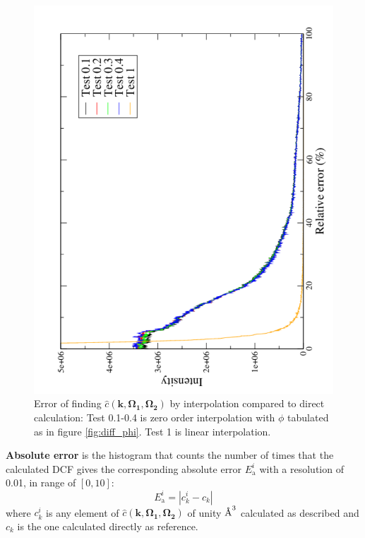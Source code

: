 \begin{figure}[h]
\begin{minipage}[t]{1.1\textwidth}
\begin{center}
\par\end{center}

\begin{center}
\includegraphics[angle=-90,scale=0.3]{_figure/c_local_to_global_coordinates_32_96/relative_error}
\par\end{center}

\caption[Error of finding $\hat{c}(\mathbf{k},\mathbf{\Omega_{1}},\mathbf{\Omega_{2}})$
by interpolation compared to direct calculation]{Error of finding $\hat{c}(\mathbf{k},\mathbf{\Omega_{1}},\mathbf{\Omega_{2}})$
by interpolation compared to direct calculation: Test 0.1-0.4 is zero
order interpolation with $\phi$ tabulated as in figure \ref{fig:diff_phi}.
Test 1 is linear interpolation.\label{fig:error}}
%
\end{minipage}
\end{figure}


\textbf{Absolute error} is the histogram that counts the number of
times that the calculated DCF gives the corresponding absolute error
$E_{\mathrm{a}}^{i}$ with a resolution of 0.01, in range of $[0,10]$:
\begin{equation}
E_{\mathrm{a}}^{i}=\left|c_{k}^{i}-c_{k}\right|
\end{equation}
where $c_{k}^{i}$ is any element of $\hat{c}(\mathbf{k},\mathbf{\Omega_{1}},\mathbf{\Omega_{2}})$
of unity $\lyxmathsym{\AA}^{3}$ calculated as described and $c_{k}$
is the one calculated directly as reference.

